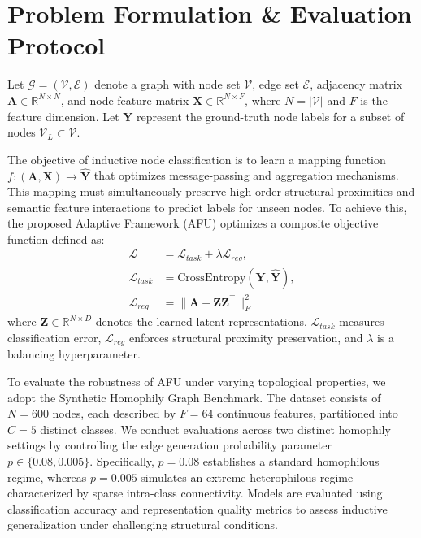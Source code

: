 \documentclass[10pt,twocolumn]{article}
\begin{document}
\section{Problem Formulation \& Evaluation Protocol}
Let $\mathcal{G} = (\mathcal{V}, \mathcal{E})$ denote a graph with node set $\mathcal{V}$, edge set $\mathcal{E}$, adjacency matrix $\mathbf{A} \in \mathbb{R}^{N \times N}$, and node feature matrix $\mathbf{X} \in \mathbb{R}^{N \times F}$, where $N = |\mathcal{V}|$ and $F$ is the feature dimension. Let $\mathbf{Y}$ represent the ground-truth node labels for a subset of nodes $\mathcal{V}_L \subset \mathcal{V}$. 

The objective of inductive node classification is to learn a mapping function $f: (\mathbf{A}, \mathbf{X}) \rightarrow \hat{\mathbf{Y}}$ that optimizes message-passing and aggregation mechanisms. This mapping must simultaneously preserve high-order structural proximities and semantic feature interactions to predict labels for unseen nodes. To achieve this, the proposed Adaptive Framework (\textsc{AFU}) optimizes a composite objective function defined as:
\begin{align}
    \mathcal{L} &= \mathcal{L}_{task} + \lambda \mathcal{L}_{reg}, \\
    \mathcal{L}_{task} &= \text{CrossEntropy}(\mathbf{Y}, \hat{\mathbf{Y}}), \\
    \mathcal{L}_{reg} &= \|\mathbf{A} - \mathbf{Z}\mathbf{Z}^\top\|_F^2
\end{align}
where $\mathbf{Z} \in \mathbb{R}^{N \times D}$ denotes the learned latent representations, $\mathcal{L}_{task}$ measures classification error, $\mathcal{L}_{reg}$ enforces structural proximity preservation, and $\lambda$ is a balancing hyperparameter.

To evaluate the robustness of \textsc{AFU} under varying topological properties, we adopt the Synthetic Homophily Graph Benchmark. The dataset consists of $N = 600$ nodes, each described by $F = 64$ continuous features, partitioned into $C = 5$ distinct classes. We conduct evaluations across two distinct homophily settings by controlling the edge generation probability parameter $p \in \{0.08, 0.005\}$. Specifically, $p = 0.08$ establishes a standard homophilous regime, whereas $p = 0.005$ simulates an extreme heterophilous regime characterized by sparse intra-class connectivity. Models are evaluated using classification accuracy and representation quality metrics to assess inductive generalization under challenging structural conditions.
\end{document}
